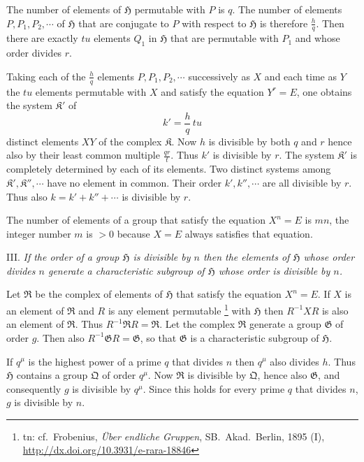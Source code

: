 \documentclass[a5paper,12pt]{article}
\let\fr\mathfrak
\newcommand{\CG}{\fr{G}}
\newcommand{\CH}{\fr{H}}
\newcommand{\CK}{\fr{K}}
\newcommand{\CQ}{\fr{Q}}
\newcommand{\CR}{\fr{R}}
\newcommand{\?}{{\color{blue}${}^{(?)}$}}
\newcounter{origpagecounter}{}
\newcommand{\origpagebreak}{\mark{\arabic{origpagecounter}}\addtocounter{origpagecounter}{1}\mark{\arabic{origpagecounter}}}
\begin{document}
The number of elements of $\CH$
permutable with $P$ is $q$.
%
%
The number of elements $P, P_1, P_2, \cdots$
of $\CH$
that are conjugate to $P$
with respect to $\CH$ 
is therefore $\frac{h}{q}$.
%
%
Then there are exactly $t u$
elements $Q_1$ in $\CH$
that are permutable with $P_1$
and
whose order divides $r$.
%
%
\origpagebreak
%
%
Taking
each of the $\frac{h}{q}$ elements
$P, P_1, P_2, \cdots$
successively as $X$
and
each time
as $Y$
the $t u$ elements permutable with $X$
and
satisfy the equation $Y^r = E$,
one obtains
the system
$\CK'$
of %
\[
	k' = \frac{h}{q} \, t u
\]
distinct elements $X Y$ of the complex $\CK$.
%
%
Now $h$ is divisible 
by both $q$ and $r$
hence
also by their
least common multiple $\frac{q r}{t}$.
%
%
Thus $k'$ is divisible by $r$.
%
%
The system $\CK'$
is completely determined
by each of its elements.
%
%
Two distinct systems 
among $\CK', \CK'', \cdots$
have no element in common.
%
%
Their order $k', k'', \cdots$
are all divisible by $r$.
%
%
Thus also $k = k' + k'' + \cdots$ is
divisible by $r$.


The number of elements of a group
that satisfy the equation $X^n = E$
is $m n$,
the integer number $m$ is $> 0$
because
$X = E$ always satisfies that equation.


III.
%
\label{t:2-3}
%
\emph{ %
If the order of a group $\CH$ is divisible by $n$
then
the elements of $\CH$
whose order divides $n$
generate
a characteristic subgroup
of $\CH$
whose order is divisible by $n$.
}


Let $\CR$ be the complex of elements of $\CH$
that satisfy the equation $X^n = E$.
%
%
If $X$ is an element of $\CR$
and $R$ is any element permutable%
\footnote{%
	\scriptsize
	tn: cf.~Frobenius,
	\emph{\"Uber endliche Gruppen},
	SB.~Akad.~Berlin,
	1895 (I),
	\href{http://dx.doi.org/10.3931/e-rara-18846}{http://dx.doi.org/10.3931/e-rara-18846}
}
with $\CH$
then
$R^{-1} X R$ 
is also an element of $\CR$.
%
%
Thus $R^{-1} \CR R = \CR$.
%
%
Let the complex $\CR$ generate a group $\CG$
of order $g$.
%
%
Then also $R^{-1} \CG R = \CG$,
so that
$\CG$ is a characteristic subgroup of $\CH$.


If $q^\mu$ is the highest power 
of a prime $q$
that divides $n$
then $q^\mu$ also divides $h$.
%
%
Thus $\CH$ contains a group $\CQ$ of order $q^\mu$.
%
%
Now $\CR$ is divisible by $\CQ$,
hence also $\CG$,
and consequently
$g$ is divisible by $q^\mu$.
%
%
Since this holds for every prime $q$ that divides $n$,
$g$ is divisible by $n$.
\end{document}
